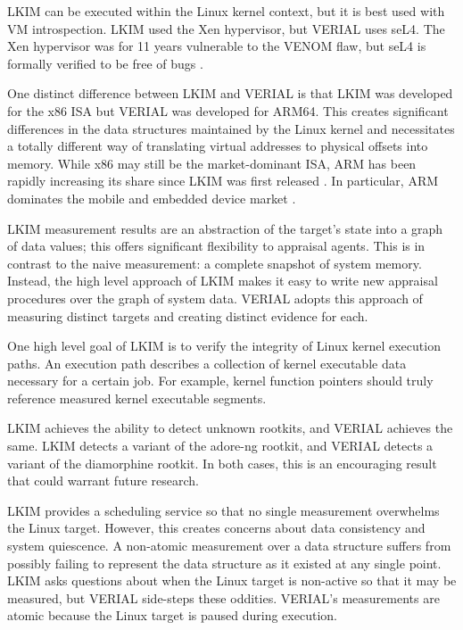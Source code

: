 \documentclass[a4paper,twoside]{article}
\begin{document}
LKIM can be executed within the Linux kernel context, but it is best used with VM introspection. LKIM used the Xen hypervisor, but VERIAL uses seL4. The Xen hypervisor was for 11 years vulnerable to the VENOM flaw, but seL4 is formally verified to be free of bugs \cite{VENOM, seL4Proof}.

One distinct difference between LKIM and VERIAL is that LKIM was developed for the x86 ISA but VERIAL was developed for ARM64. This creates significant differences in the data structures maintained by the Linux kernel and necessitates a totally different way of translating virtual addresses to physical offsets into memory. While x86 may still be the market-dominant ISA, ARM has been rapidly increasing its share since LKIM was first released \cite{ARMMarketShare}. In particular, ARM dominates the mobile and embedded device market \cite{ARMMarketShare}.

LKIM measurement results are an abstraction of the target's state into a graph of data values; this offers significant flexibility to appraisal agents. This is in contrast to the naive measurement: a complete snapshot of system memory. Instead, the high level approach of LKIM makes it easy to write new appraisal procedures over the graph of system data. VERIAL adopts this approach of measuring distinct targets and creating distinct evidence for each.

One high level goal of LKIM is to verify the integrity of Linux kernel execution paths. An execution path describes a collection of kernel executable data necessary for a certain job. For example, kernel function pointers should truly reference measured kernel executable segments.

LKIM achieves the ability to detect unknown rootkits, and VERIAL achieves the same. LKIM detects a variant of the adore-ng rootkit, and VERIAL detects a variant of the diamorphine rootkit. In both cases, this is an encouraging result that could warrant future research.

LKIM provides a scheduling service so that no single measurement overwhelms the Linux target. However, this creates concerns about data consistency and system quiescence. A non-atomic measurement over a data structure suffers from possibly failing to represent the data structure as it existed at any single point. LKIM asks questions about when the Linux target is non-active so that it may be measured, but VERIAL side-steps these oddities. VERIAL's measurements are atomic because the Linux target is paused during execution.
\end{document}
